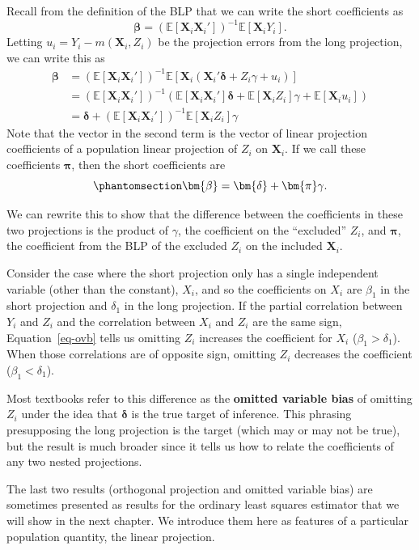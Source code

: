 \documentclass[
  13pt,
  letterpaper,
  DIV=11,
  numbers=noendperiod]{scrreprt}
\newcommand{\bs}{\bm}
\newcommand{\mb}{\bm}
\newcommand{\E}{\mathbb{E}}
\newcommand{\X}{\mb{X}}
\newcommand{\bfbeta}{\mb{\beta}}
\theoremstyle{plain}
\theoremstyle{plain}
\theoremstyle{definition}
\theoremstyle{definition}
\theoremstyle{remark}
\begin{document}
Recall from the definition of the BLP that we can write the short
coefficients as \[ 
\bfbeta = \left(\E[\X_{i}\X_{i}']\right)^{-1} \E[\X_{i}Y_{i}].
\] Letting \(u_i = Y_i - m(\X_{i}, Z_{i})\) be the projection errors
from the long projection, we can write this as \[ 
\begin{aligned}
  \bfbeta &= \left(\E[\X_{i}\X_{i}']\right)^{-1} \E[\X_{i}(\X_{i}'\bs{\delta} + Z_{i}\gamma + u_{i})] \\
              &= \left(\E[\X_{i}\X_{i}']\right)^{-1}(\E[\X_{i}\X_{i}']\bs{\delta} + \E[\X_{i}Z_{i}]\gamma + \E[\X_{i}u_{i}]) \\
              &= \bs{\delta} + \left(\E[\X_{i}\X_{i}']\right)^{-1}\E[\X_{i}Z_{i}]\gamma
\end{aligned}
\] Note that the vector in the second term is the vector of linear
projection coefficients of a population linear projection of \(Z_i\) on
\(\X_i\). If we call these coefficients \(\bs{\pi}\), then the short
coefficients are \begin{equation}\protect\phantomsection\label{eq-ovb}{ 
\bfbeta = \bs{\delta} + \bs{\pi}\gamma. 
}\end{equation}

We can rewrite this to show that the difference between the coefficients
in these two projections is the product of \(\gamma\), the coefficient
on the ``excluded'' \(Z_i\), and \(\bs{\pi}\), the coefficient from the
BLP of the excluded \(Z_i\) on the included \(\X_i\).

Consider the case where the short projection only has a single
independent variable (other than the constant), \(X_i\), and so the
coefficients on \(X_i\) are \(\beta_1\) in the short projection and
\(\delta_1\) in the long projection. If the partial correlation between
\(Y_i\) and \(Z_i\) and the correlation between \(X_i\) and \(Z_i\) are
the same sign, Equation~\ref{eq-ovb} tells us omitting \(Z_i\) increases
the coefficient for \(X_i\) (\(\beta_1 > \delta_1\)). When those
correlations are of opposite sign, omitting \(Z_i\) decreases the
coefficient (\(\beta_1 < \delta_1\)).

Most textbooks refer to this difference as the \textbf{omitted variable
bias} of omitting \(Z_i\) under the idea that \(\bs{\delta}\) is the
true target of inference. This phrasing presupposing the long projection
is the target (which may or may not be true), but the result is much
broader since it tells us how to relate the coefficients of any two
nested projections.

The last two results (orthogonal projection and omitted variable bias)
are sometimes presented as results for the ordinary least squares
estimator that we will show in the next chapter. We introduce them here
as features of a particular population quantity, the linear projection.
\end{document}
